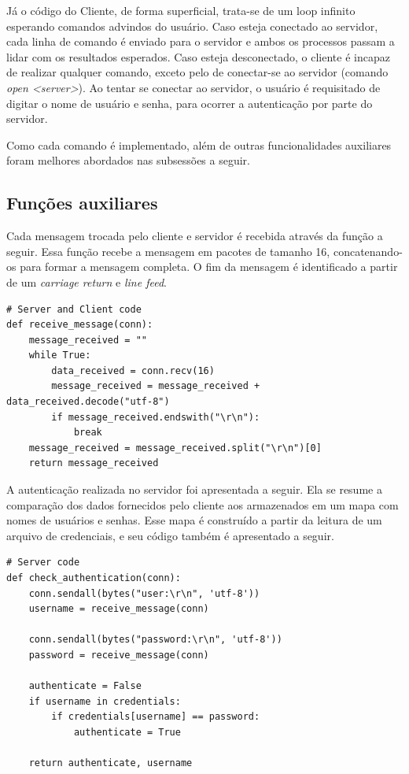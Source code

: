 \documentclass[conference]{IEEEtran}
\begin{document}
Já o código do Cliente, de forma superficial, trata-se de um loop infinito esperando comandos advindos do usuário. Caso esteja conectado ao servidor, cada linha de comando é enviado para o servidor e ambos os processos passam a lidar com os resultados esperados. Caso esteja desconectado, o cliente é incapaz de realizar qualquer comando, exceto pelo de conectar-se ao servidor (comando \textit{open <server>}). Ao tentar se conectar ao servidor, o usuário é requisitado de digitar o nome de usuário e senha, para ocorrer a autenticação por parte do servidor.

Como cada comando é implementado, além de outras funcionalidades auxiliares foram melhores abordados nas subsessões a seguir.

\subsection{Funções auxiliares}

Cada mensagem trocada pelo cliente e servidor é recebida através da função a seguir. Essa função recebe a mensagem em pacotes de tamanho 16, concatenando-os para formar a mensagem completa. O fim da mensagem é identificado a partir de um \textit{carriage return} e \textit{line feed}.

\begin{lstlisting}
# Server and Client code
def receive_message(conn):
    message_received = ""
    while True:
        data_received = conn.recv(16)
        message_received = message_received + data_received.decode("utf-8")
        if message_received.endswith("\r\n"):
            break
    message_received = message_received.split("\r\n")[0]
    return message_received
\end{lstlisting}

A autenticação realizada no servidor foi apresentada a seguir. Ela se resume a comparação dos dados fornecidos pelo cliente aos armazenados em um mapa com nomes de usuários e senhas. Esse mapa é construído a partir da leitura de um arquivo de credenciais, e seu código também é apresentado a seguir.

\begin{lstlisting}
# Server code
def check_authentication(conn):
	conn.sendall(bytes("user:\r\n", 'utf-8'))
	username = receive_message(conn)

	conn.sendall(bytes("password:\r\n", 'utf-8'))
	password = receive_message(conn)
	
	authenticate = False
	if username in credentials:
		if credentials[username] == password:
			authenticate = True

	return authenticate, username
\end{lstlisting}
\end{document}
